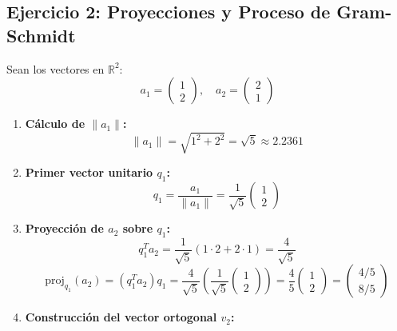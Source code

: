 \documentclass[11pt,a4paper]{article}
\theoremstyle{definition}
\theoremstyle{remark}
\begin{document}
\subsection{Ejercicio 2: Proyecciones y Proceso de Gram-Schmidt}
Sean los vectores en $\mathbb{R}^2$:
\begin{equation}
    a_1 = \begin{pmatrix} 1 \\ 2 \end{pmatrix}, \quad a_2 = \begin{pmatrix} 2 \\ 1 \end{pmatrix}
\end{equation}

\begin{enumerate}[leftmargin=*]
    \item \textbf{Cálculo de $\|a_1\|$:}
    \begin{equation}
        \|a_1\| = \sqrt{1^2 + 2^2} = \sqrt{5} \approx 2.2361
    \end{equation}
    \item \textbf{Primer vector unitario $q_1$:}
    \begin{equation}
        q_1 = \frac{a_1}{\|a_1\|} = \frac{1}{\sqrt{5}} \begin{pmatrix} 1 \\ 2 \end{pmatrix}
    \end{equation}
    \item \textbf{Proyección de $a_2$ sobre $q_1$:}
    \begin{equation}
        q_1^T a_2 = \frac{1}{\sqrt{5}} (1\cdot 2 + 2\cdot 1) = \frac{4}{\sqrt{5}}
    \end{equation}
    \begin{equation}
        \text{proj}_{q_1}(a_2) = (q_1^T a_2) q_1 = \frac{4}{\sqrt{5}} \left( \frac{1}{\sqrt{5}} \begin{pmatrix} 1 \\ 2 \end{pmatrix} \right) = \frac{4}{5} \begin{pmatrix} 1 \\ 2 \end{pmatrix} = \begin{pmatrix} 4/5 \\ 8/5 \end{pmatrix}
    \end{equation}
    \item \textbf{Construcción del vector ortogonal $v_2$:}

\end{enumerate}
\end{document}
